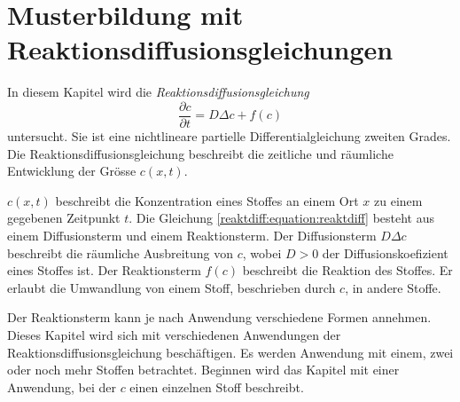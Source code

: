%
%
%
%
\chapter{Musterbildung mit Reaktionsdiffusionsgleichungen\label{chapter:reaktdiff}}
\begin{refsection}
%
%

\noindent
In diesem Kapitel wird die \emph{Reaktionsdiffusionsgleichung}
%
\begin{equation}
\label{reaktdiff:equation:reaktdiff}
\frac{\partial c}{\partial t} = D \Delta c + f(c)
\end{equation}
untersucht.
Sie ist eine nichtlineare partielle Differentialgleichung zweiten Grades.
Die Reaktionsdiffusionsgleichung beschreibt die zeitliche und räumliche Entwicklung der Grösse \(c(x,t)\).
%

\(c(x,t)\) beschreibt die Konzentration eines Stoffes an einem Ort \(x\) zu einem gegebenen Zeitpunkt \(t\).
%
Die Gleichung \eqref{reaktdiff:equation:reaktdiff} besteht aus einem Diffusionsterm und einem Reaktionsterm.
Der Diffusionsterm \(D \Delta c\) beschreibt die räumliche Ausbreitung von \(c\), wobei \(D > 0\) der Diffusionskoefizient eines Stoffes ist.
%
%
Der Reaktionsterm \(f(c)\) beschreibt die Reaktion des Stoffes.
%
Er erlaubt die Umwandlung von einem Stoff, beschrieben durch \(c\), in andere Stoffe.

Der Reaktionsterm kann je nach Anwendung verschiedene Formen annehmen.
Dieses Kapitel wird sich mit verschiedenen Anwendungen der Reaktionsdiffusionsgleichung beschäftigen.
Es werden Anwendung mit einem, zwei oder noch mehr Stoffen betrachtet.
Beginnen wird das Kapitel mit einer Anwendung, bei der \(c\) einen einzelnen Stoff beschreibt.







\printbibliography[heading=subbibliography]
\end{refsection}
